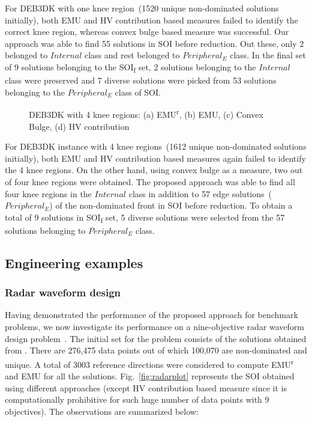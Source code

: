 For DEB3DK with one knee region~(1520 unique non-dominated solutions initially), both EMU and HV contribution based measures failed to identify the correct knee region, whereas convex bulge based measure was successful. Our approach was able to find 55 solutions in SOI before reduction. Out these, only 2 belonged to $Internal$ class and rest belonged to $Peripheral_E$ class. In the final set of 9 solutions belonging to the SOI\textsubscript{f} set, 2 solutions belonging to the $Internal$ class were preserved and 7 diverse solutions were picked from 53 solutions belonging to the $Peripheral_E$ class of SOI. 

\begin{figure*}[!htb]
	\centering    
	\quad
	\quad
	\quad       
	\caption{DEB3DK with 4 knee regions: (a) EMU\textsuperscript{r}, (b) EMU, (c) Convex Bulge, (d) HV contribution}
	\label{fig:deb3dk4plot}
\end{figure*}

For DEB3DK instance with 4 knee regions~(1612 unique non-dominated solutions initially), both EMU and HV contribution based measures again failed to identify the 4 knee regions. On the other hand, using convex bulge as a measure, two out of four knee regions were obtained. The proposed approach was able to find all four knee regions in the $Internal$ class in addition to 57 edge solutions~($Peripheral_E$) of the non-dominated front in SOI before reduction. To obtain a total of 9 solutions in SOI\textsubscript{f} set, 5 diverse solutions were selected from the 57 solutions belonging to $Peripheral_E$ class. 

\subsection{Engineering examples}       
\subsubsection{Radar waveform design}
Having demonstrated the performance of the proposed approach for benchmark problems, we now investigate its performance on a nine-objective radar waveform design problem~\cite{hughes2007radar}. The initial set for the problem consists of the solutions obtained from \cite{radarevan}. There are 276,475 data points out of which 100,070 are non-dominated and unique. A total of 3003 reference directions were considered to compute EMU\textsuperscript{r} and EMU for all the solutions. Fig.~\ref{fig:radarplot} represents the SOI obtained using different approaches (except HV contribution based measure since it is computationally prohibitive for such huge number of data points with 9 objectives). The observations are summarized below:

